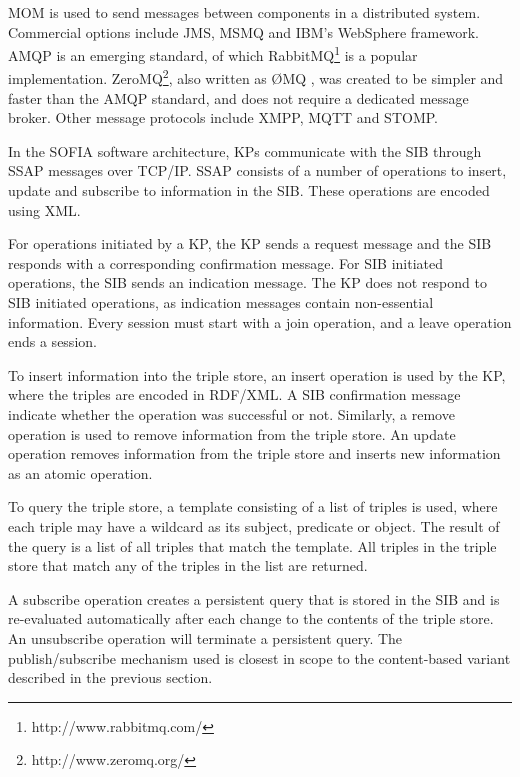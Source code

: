 \ac{MOM} is used to send messages between components in a distributed system. Commercial options include \ac{JMS}, \ac{MSMQ} and IBM's WebSphere framework.  \ac{AMQP} is an emerging standard, of which RabbitMQ\footnote{http://www.rabbitmq.com/} is a popular implementation. ZeroMQ\footnote{http://www.zeromq.org/}, also written as \O MQ , was created to be simpler and faster than the \ac{AMQP} standard, and does not require a dedicated message broker. Other message protocols include \ac{XMPP}, \ac{MQTT} and \ac{STOMP}.

In the \ac{SOFIA} software architecture, \acp{KP} communicate with the \ac{SIB} through \ac{SSAP} messages \cite{Honkola2010} over TCP/IP. \ac{SSAP} consists of a number of operations to insert, update and subscribe to information in the \ac{SIB}. These operations are encoded using \ac{XML}.

For operations initiated by a \ac{KP}, the \ac{KP} sends a request message and the \ac{SIB} responds with a corresponding confirmation message. For \ac{SIB} initiated operations, the \ac{SIB} sends an indication message. The \ac{KP} does not respond to \ac{SIB} initiated operations, as indication messages contain non-essential information. Every session must start with a join operation, and a leave operation ends a session.

To insert information into the triple store, an insert operation is used by the \ac{KP}, where the triples are encoded in RDF/XML.  A \ac{SIB} confirmation message indicate whether the operation was successful or not. Similarly, a remove operation is used to remove information from the triple store. An update operation removes information from the triple store and inserts new information as an atomic operation.

To query the triple store, a template consisting of a list of triples is used, where each triple may have a wildcard as its subject, predicate or object. The result of the query is a list of all triples that match the template. All triples in the triple store that match any of the triples in the list are returned.

A subscribe operation creates a persistent query that is stored in the \ac{SIB} and is re-evaluated automatically after each change to the contents of the triple store. An unsubscribe operation will terminate a persistent query. The publish/subscribe mechanism used is closest in scope to the content-based variant described in the previous section.

